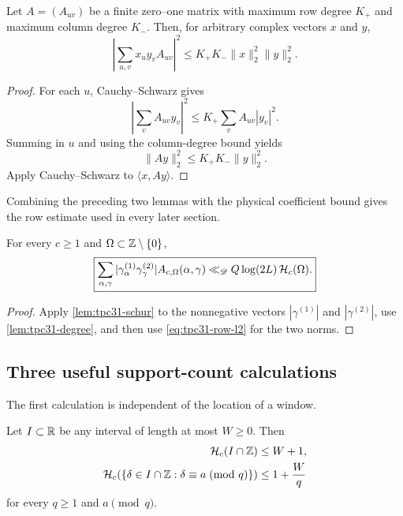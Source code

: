 \begin{lemma}
\label{lem:tpc31-schur}
Let $A=(A_{uv})$ be a finite zero--one matrix with maximum row degree
$K_+$ and maximum column degree $K_-$.  Then, for arbitrary complex
vectors $x$ and $y$,
\begin{equation}
 \left|\sum_{u,v}x_u y_v A_{uv}\right|^2
 \le K_+K_-\|x\|_2^2\|y\|_2^2.
 \label{eq:tpc31-schur}
\end{equation}
\end{lemma}

\begin{proof}
For each $u$, Cauchy--Schwarz gives
\[
 \left|\sum_vA_{uv}y_v\right|^2
 \le K_+\sum_vA_{uv}|y_v|^2.
\]
Summing in $u$ and using the column-degree bound yields
\[
 \|Ay\|_2^2\le K_+K_-\|y\|_2^2.
\]
Apply Cauchy--Schwarz to $\langle x,A y\rangle$.
\end{proof}

Combining the preceding two lemmas with the physical coefficient
bound gives the row estimate used in every later section.

\begin{proposition}
\label{prop:tpc31-row-entropy}
For every $c\ge1$ and $\Omega\subset\mathbb Z\setminus\{0\}$,
\begin{equation}
 \boxed{
 \sum_{\alpha,\gamma}
 |\gamma_\alpha^{(1)}\gamma_\gamma^{(2)}|
 A_{c,\Omega}(\alpha,\gamma)
 \ll_{\mathscr D}
 Q\log(2L)\,\mathcal H_c(\Omega).}
 \label{eq:tpc31-row-entropy-bound}
\end{equation}
\end{proposition}

\begin{proof}
Apply \cref{lem:tpc31-schur} to the nonnegative vectors
$|\gamma^{(1)}|$ and $|\gamma^{(2)}|$, use
\cref{lem:tpc31-degree}, and then use
\eqref{eq:tpc31-row-l2} for the two norms.
\end{proof}

\subsection{Three useful support-count calculations}

The first calculation is independent of the location of a window.

\begin{lemma}
\label{lem:tpc31-window-residue-entropy}
Let $I\subset\mathbb R$ be any interval of length at most $W\ge0$.
Then
\begin{align}
 \mathcal H_c(I\cap\mathbb Z)&\le W+1,
 \label{eq:tpc31-window-entropy}\\
 \mathcal H_c(\{\delta\in I\cap\mathbb Z:\delta\equiv a\!\pmod q\})
 &\le 1+\frac Wq
 \label{eq:tpc31-window-residue-entropy}
\end{align}
for every $q\ge1$ and $a\pmod q$.
\end{lemma}


